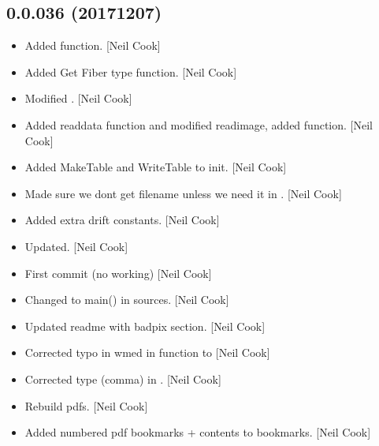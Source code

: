 \documentclass[a4paper,10pt,english]{report}
\begin{document}
\subsection{0.0.036 (2017\sphinxhyphen{}12\sphinxhyphen{}07)}
\label{\detokenize{misc/changelog:id534}}\begin{itemize}
\item {} 
Added  function. {[}Neil Cook{]}

\item {} 
Added Get Fiber type function. {[}Neil Cook{]}

\item {} 
Modified . {[}Neil Cook{]}

\item {} 
Added readdata function and modified readimage, added 
function. {[}Neil Cook{]}

\item {} 
Added MakeTable and WriteTable to init. {[}Neil Cook{]}

\item {} 
Made sure we dont get filename unless we need it in
. {[}Neil Cook{]}

\item {} 
Added extra drift constants. {[}Neil Cook{]}

\item {} 
Updated. {[}Neil Cook{]}

\item {} 
First commit (no working) {[}Neil Cook{]}

\item {} 
Changed  to main() in sources. {[}Neil Cook{]}

\item {} 
Updated readme with badpix section. {[}Neil Cook{]}

\item {} 
Corrected typo in wmed \sphinxhyphen{} in  function
 to  {[}Neil Cook{]}

\item {} 
Corrected type (comma) in . {[}Neil Cook{]}

\item {} 
Rebuild pdfs. {[}Neil Cook{]}

\item {} 
Added numbered pdf bookmarks + contents to bookmarks. {[}Neil Cook{]}


\end{itemize}
\end{document}
